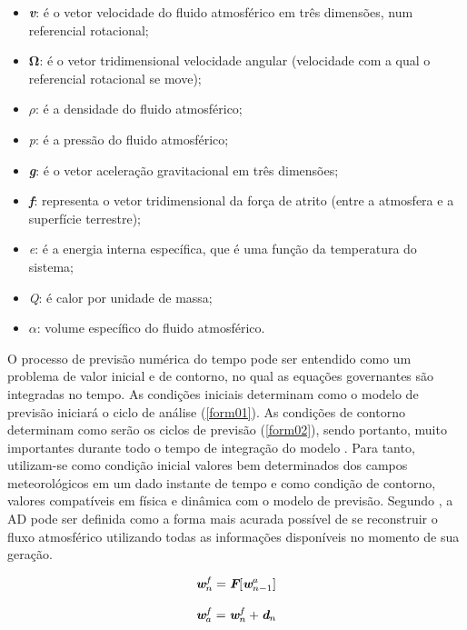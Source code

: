 \begin{itemize}
\item \textbf{\textit{v}}: é o vetor velocidade do fluido atmosférico em três dimensões, num referencial rotacional;
\item $\mathbf{\Omega}$: é o vetor tridimensional velocidade angular (velocidade com a qual o referencial rotacional se move);
\item $\rho$: é a densidade do fluido atmosférico;
\item \textit{p}: é a pressão do fluido atmosférico;
\item \textbf{\textit{g}}: é o vetor aceleração gravitacional em três dimensões;
\item \textbf{\textit{f}}: representa o vetor tridimensional da força de atrito (entre a atmosfera e a superfície terrestre);
\item \textit{e}: é a energia interna específica, que é uma função da temperatura do sistema;
\item \textit{Q}: é calor por unidade de massa;
\item $\alpha$: volume específico do fluido atmosférico. 
\end{itemize}

O processo de previsão numérica do tempo pode ser entendido como um problema de valor inicial e de contorno, no qual as equações governantes são integradas no tempo. As condições iniciais determinam como o modelo de previsão iniciará o ciclo de análise (\autoref{form01}). As condições de contorno determinam como serão os ciclos de previsão (\autoref{form02}), sendo portanto, muito importantes durante todo o tempo de integração do modelo \cite{nowosad01}. Para tanto, utilizam-se como condição inicial valores bem determinados dos campos meteorológicos em um dado instante de tempo e como condição de contorno, valores compatíveis em física e dinâmica com o modelo de previsão. Segundo \cite{talagrand97}, a AD pode ser definida como a forma mais acurada possível de se reconstruir o fluxo atmosférico utilizando todas as informações disponíveis no momento de sua geração. 

\begin{equation}
\textit{\textbf{w}}^{f}_{n}=\textit{\textbf{F}}[\textit{\textbf{w}}^{a}_{n-1}]
 \label{form04}
\end{equation}

\begin{equation}
\textit{\textbf{w}}^{f}_{a}=\textit{\textbf{w}}^{f}_{n}+\textit{\textbf{d}}_{n}
 \label{form05}
\end{equation}

